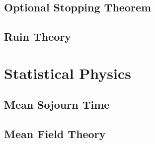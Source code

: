 \documentclass[11pt]{report} %
\begin{document}
\section{Optional Stopping Theorem}

\section{Ruin Theory}

\chapter{Statistical Physics}

\section{Mean Sojourn Time}

\section{Mean Field Theory}

{}

\end{document}
